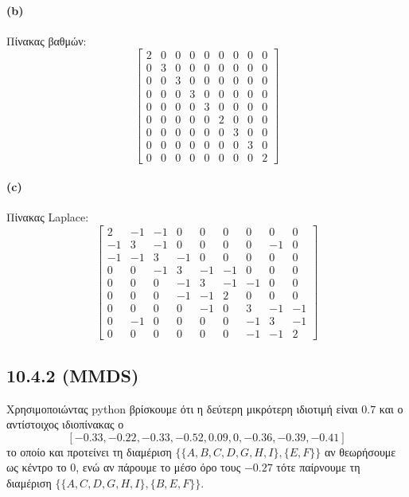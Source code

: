 \documentclass[a4paper,11pt]{article}
\begin{document}
\paragraph{(b)} Πίνακας βαθμών:
\[
	\begin{bmatrix}
		2 & 0 & 0 & 0 & 0 & 0 & 0 & 0 & 0 \\
		0 & 3 & 0 & 0 & 0 & 0 & 0 & 0 & 0 \\
		0 & 0 & 3 & 0 & 0 & 0 & 0 & 0 & 0 \\
		0 & 0 & 0 & 3 & 0 & 0 & 0 & 0 & 0 \\
		0 & 0 & 0 & 0 & 3 & 0 & 0 & 0 & 0 \\
		0 & 0 & 0 & 0 & 0 & 2 & 0 & 0 & 0 \\
		0 & 0 & 0 & 0 & 0 & 0 & 3 & 0 & 0 \\
		0 & 0 & 0 & 0 & 0 & 0 & 0 & 3 & 0 \\
		0 & 0 & 0 & 0 & 0 & 0 & 0 & 0 & 2
	\end{bmatrix}
\]

\paragraph{(c)} Πίνακας Laplace:
\[
	\begin{bmatrix}
		2 & -1 & -1 & 0 & 0 & 0 & 0 & 0 & 0 \\
		-1 & 3 & -1 & 0 & 0 & 0 & 0 & -1 & 0 \\
		-1 & -1 & 3 & -1 & 0 & 0 & 0 & 0 & 0 \\
		0 & 0 & -1 & 3 & -1 & -1 & 0 & 0 & 0 \\
		0 & 0 & 0 & -1 & 3 & -1 & -1 & 0 & 0 \\
		0 & 0 & 0 & -1 & -1 & 2 & 0 & 0 & 0 \\
		0 & 0 & 0 & 0 & -1 & 0 & 3 & -1 & -1 \\
		0 & -1 & 0 & 0 & 0 & 0 & -1 & 3 & -1 \\
		0 & 0 & 0 & 0 & 0 & 0 & -1 & -1 & 2
	\end{bmatrix}
\]

\subsection*{10.4.2 (MMDS)}

Χρησιμοποιώντας python βρίσκουμε ότι η δεύτερη μικρότερη ιδιοτιμή είναι $0.7$ και ο αντίστοιχος ιδιοπίνακας ο
\[[-0.33,-0.22,-0.33,-0.52,0.09,0,-0.36,-0.39,-0.41]\]
το οποίο και προτείνει τη διαμέριση $\{\{A,B,C,D,G,H,I\},\{E,F\}\}$ αν θεωρήσουμε ως κέντρο το $0$, ενώ αν πάρουμε το μέσο όρο τους $-0.27$ τότε παίρνουμε τη διαμέριση $\{\{A,C,D,G,H,I\},\{B,E,F\}\}$.
\end{document}
